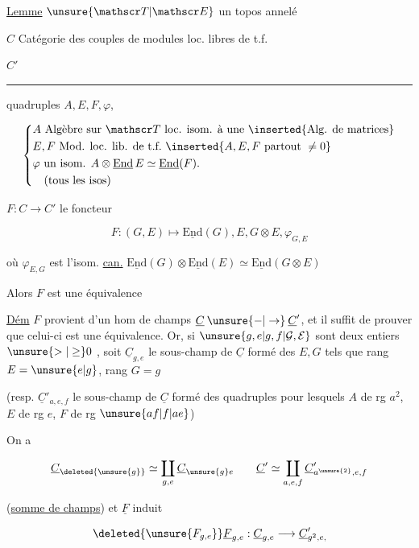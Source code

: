 \uline{Lemme} $\unsure{\mathscr T|\mathscr E}$ un topos  annelé

$C$ Catégorie des couples  de modules loc. libres de t.f. 


$C'$ \rule{3em}{.35pt} quadruples $A,E,F,\varphi$,

\[
\left\{\begin{aligned}
&A\ \text{Algèbre sur }\mathscr T\ \text{loc. isom. à une }\inserted{\text{Alg. de matrices}}\\
&E,F\ \text{Mod. loc. lib. de t.f.}\ \inserted{A,E,F\ \text{partout }\ne0}\\
&\varphi\ \text{un isom. } A\otimes\underline{\mathrm{End}}\,E\simeq\underline{\mathrm{End}}(F).\\
&\hspace{1em}(\text{tous les isos})
\end{aligned}\right.
\]

$F:C\longrightarrow C'$ le foncteur

\[
F:(G,E)\longmapsto\underline{\mathrm{End}}(G),E,G\otimes E,\varphi_{G,E}
\]

où $\varphi_{E,G}$ est l'isom. \uline{can.} $\underline{\mathrm{End}}(G)\otimes\underline{\mathrm{End}}(E)\simeq\underline{\mathrm{End}}(G\otimes E)$

Alors $F$ est une équivalence

\uline{Dém} $F$ provient d'un hom de champs $\underline C\mathbin{\unsure{-|\to}}\underline C'$, et il suffit
de prouver que celui-ci est une équivalence. Or, si $\unsure{g,e|g,f|\mathcal G,\mathcal E}$ sont
deux entiers $\unsure{>|\geq}0$ , soit $\underline C_{g,e}$ le sous-champ de $\underline C$ formé des $E,G$ tels
que rang $E=\unsure{e|g}$, rang $G=g$

(resp. $\underline C'_{a,e,f}$ le sous-champ de $\underline C$ formé des quadruples
pour lesquels $A$ de rg $a^2$, $E$ de rg $e$, $F$ de rg $\unsure{af|f|ae}$)

On a

\[
\underline C_{\deleted{\unsure{g}}}\simeq\coprod_{g,e}\underline C_{\unsure{g}e}\qquad
\underline C'\simeq\coprod_{a,e,f}\underline C'_{a^{\unsure{2}},e,f}
\]

(\uline{somme de champs}) et $\underline F$ induit

\[
\deleted{\unsure{F_{g,e}}}\underline F_{g,e}:\underline C_{g,e}\longrightarrow\underline C'_{g^{2},e,}
\]

